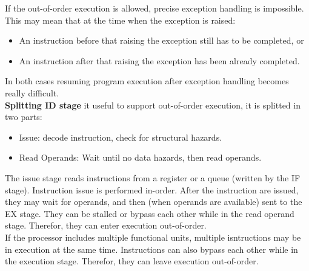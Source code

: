 \documentclass[12pt]{article}
\begin{document}
If the out-of-order execution is allowed, precise exception handling is impossible. This may mean that at the time when the exception is raised:
\begin{itemize}
  \item An instruction before that raising the exception still has to be completed, or
  \item An instruction after that raising the exception has been already completed.
\end{itemize}
In both cases resuming program execution after exception handling becomes really difficult.\\
\textbf{Splitting ID stage} it useful to support out-of-order execution, it is splitted in two parts:
\begin{itemize}
  \item Issue: decode instruction, check for structural hazards.
  \item Read Operands: Wait until no data hazards, then read operands.
\end{itemize}
The issue stage reads instructions from a register or a queue (written by the IF stage). Instruction issue is performed in-order. After the instruction are issued, they may wait for operands, and then (when operands are available) sent to the EX stage. They can be stalled or bypass each other while in the read operand stage. Therefor, they can enter execution out-of-order.\\
If the processor includes multiple functional units, multiple isntructions may be in execution at the same time. Instructions can also bypass each other while in the execution stage. Therefor, they can leave execution out-of-order.\\
\end{document}
